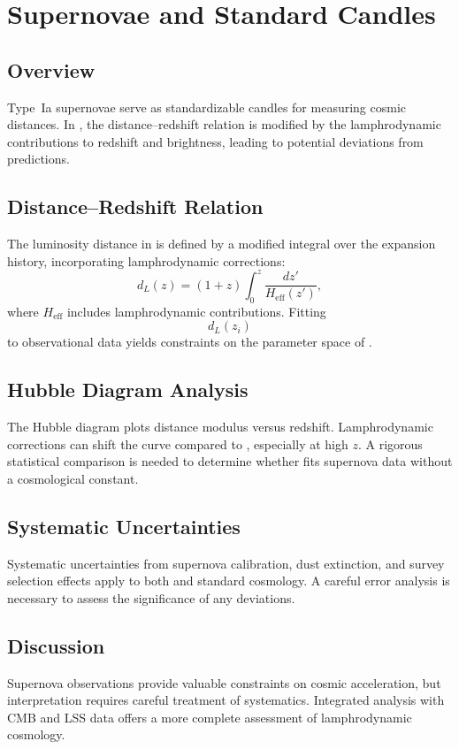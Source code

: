 
\chapter{Supernovae and Standard Candles}
\label{chap:supernovae}

\section{Overview}

Type~Ia supernovae serve as standardizable candles for measuring cosmic
distances. In \rsvpabbr{}, the distance--redshift relation is modified by
the lamphrodynamic contributions to redshift and brightness, leading to
potential deviations from \LCDM{} predictions.

\section{Distance--Redshift Relation}

The luminosity distance in \rsvpabbr{} is defined by a modified integral
over the expansion history, incorporating lamphrodynamic corrections:
\[
  d_L(z)
  = (1+z)
    \int_0^z \frac{dz'}{H_{\mathrm{eff}}(z')},
\]
where $H_{\mathrm{eff}}$ includes lamphrodynamic contributions. Fitting
\[
  d_L(z_i)
\]
to observational data yields constraints on the parameter space of \rsvpabbr{}.

\section{Hubble Diagram Analysis}

The Hubble diagram plots distance modulus versus redshift. Lamphrodynamic
corrections can shift the curve compared to \LCDM{}, especially at high $z$.
A rigorous statistical comparison is needed to determine whether 
\rsvpabbr{} fits supernova data without a cosmological constant.

\section{Systematic Uncertainties}

Systematic uncertainties from supernova calibration, dust extinction, and
survey selection effects apply to both \rsvpabbr{} and standard cosmology.
A careful error analysis is necessary to assess the significance of any
deviations.

\section{Discussion}

Supernova observations provide valuable constraints on cosmic acceleration,
but interpretation requires careful treatment of systematics. Integrated
analysis with CMB and LSS data offers a more complete assessment of
lamphrodynamic cosmology.

\clearpage

